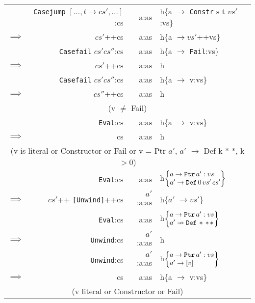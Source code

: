 \documentclass[10pt, a4paper]{article}
\begin{document}
\begin{center}
\begin{tabular}{|rrrl|}
& \verb|Casejump| $[\ldots, t \rightarrow cs', \ldots]$:cs & a:as & h\{a $\rightarrow$ \verb|Constr| s t $vs'$:vs\} \\
$\implies$ & $cs'$++cs & a:as & h\{a $\rightarrow vs'$++vs\} \\
\hline

& \verb|Casefail| $cs' cs''$:cs & a:as & h\{a $\rightarrow$ \verb|Fail|:vs\} \\
$\implies$ & $cs'$++cs & a:as & h \\
\hline

& \verb|Casefail| $cs' cs''$:cs & a:as & h\{a $\rightarrow$ v:vs\} \\
$\implies$ & $cs''$++cs & a:as & h \\
\multicolumn{4}{|c|}{(v $\ne$ Fail)} \\
\hline

& \verb|Eval|:cs & a:as & h\{a $\rightarrow$ v:vs\} \\ 
$\implies$ & cs & a:as & h \\
\multicolumn{4}{|c|}{(v is literal or Constructor or Fail or v = Ptr $a'$, $a'$ $\rightarrow$ Def k * *, k$>$0)} \\
\hline

& \verb|Eval|:cs & a:as &
            h$\left\lbrace
                \begin{array}{@{}l@{}}a \rightarrow \verb|Ptr| \, a':vs \\
                           a' \rightarrow \verb|Def| \, 0 \, vs' \, cs' \verb||
                \end{array}
              \right\rbrace$ \\
$\implies$ & $cs'$++ \verb|[Unwind]|++cs & $a'$:a:as & h\{$a'$ $\rightarrow vs'$\} \\
\hline

& \verb|Eval|:cs & a:as & h$\left\lbrace
                \begin{array}{@{}l@{}}a \rightarrow \verb|Ptr| \, a':vs \\
                                      a' \nrightarrow \verb|Def| \, * \, * \, *
                \end{array}
              \right\rbrace$ \\ 
$\implies$ & \verb|Unwind|:cs & $a'$:a:as & h \\
\hline



& \verb|Unwind|:cs & $a'$:a:as &
            h$\left\lbrace
                \begin{array}{@{}l@{}}a \rightarrow \verb|Ptr| \, a':vs \\
                                      a' \rightarrow [v]
                \end{array}
              \right\rbrace$ \\
$\implies$ & cs & a:as & h\{a $\rightarrow$ v:vs\} \\
\multicolumn{4}{|c|}{(v literal or Constructor or Fail)} \\
\hline


\end{tabular}
\end{center}
\end{document}
